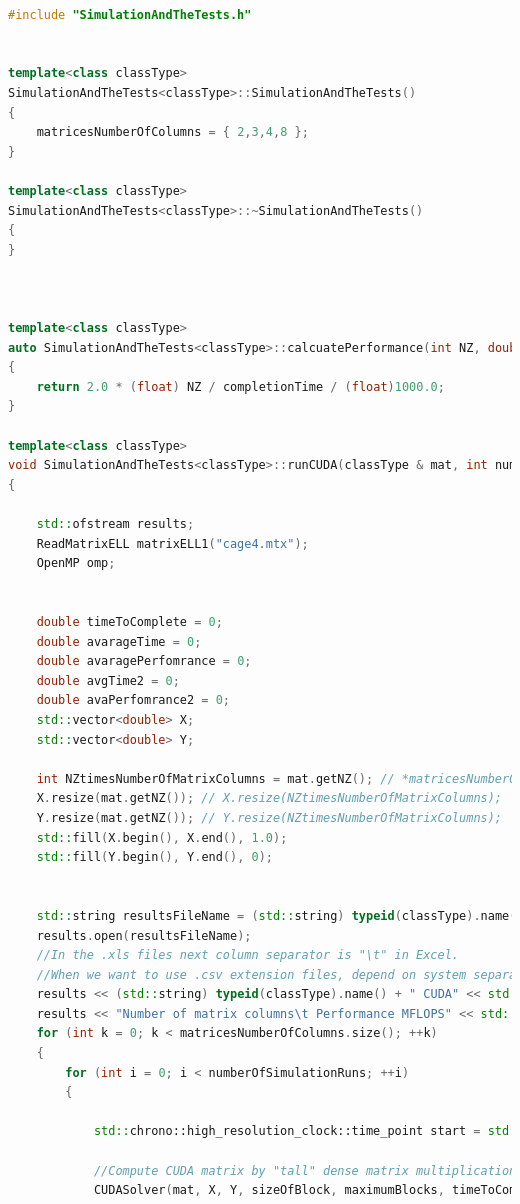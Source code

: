 \documentclass{scrreprt}
\begin{document}
\begin{lstlisting}[language=C++, caption=SimulationAndTheTests.cpp]

#include "SimulationAndTheTests.h"


template<class classType>
SimulationAndTheTests<classType>::SimulationAndTheTests()
{
	matricesNumberOfColumns = { 2,3,4,8 };
}

template<class classType>
SimulationAndTheTests<classType>::~SimulationAndTheTests()
{
}



template<class classType>
auto SimulationAndTheTests<classType>::calcuatePerformance(int NZ, double completionTime)
{
	return 2.0 * (float) NZ / completionTime / (float)1000.0;
}

template<class classType>
void SimulationAndTheTests<classType>::runCUDA(classType & mat, int numberOfThreads, int sizeOfBlock, int maximumBlocks, int numberOfSimulationRuns)
{

	std::ofstream results;
	ReadMatrixELL matrixELL1("cage4.mtx");
	OpenMP omp;


	double timeToComplete = 0;
	double avarageTime = 0;
	double avaragePerfomrance = 0;
	double avgTime2 = 0;
	double avaPerfomrance2 = 0;
	std::vector<double> X;
	std::vector<double> Y;

	int NZtimesNumberOfMatrixColumns = mat.getNZ(); // *matricesNumberOfColumns[k];
	X.resize(mat.getNZ()); // X.resize(NZtimesNumberOfMatrixColumns);
	Y.resize(mat.getNZ()); // Y.resize(NZtimesNumberOfMatrixColumns);
	std::fill(X.begin(), X.end(), 1.0);
	std::fill(Y.begin(), Y.end(), 0);


	std::string resultsFileName = (std::string) typeid(classType).name() + "CUDA" + mat.getMatrixName() + ".xls";
	results.open(resultsFileName);
	//In the .xls files next column separator is "\t" in Excel. 
	//When we want to use .csv extension files, depend on system separator could be "," or ";" .
	results << (std::string) typeid(classType).name() + " CUDA" << std::endl;
	results << "Number of matrix columns\t Performance MFLOPS" << std::endl;
	for (int k = 0; k < matricesNumberOfColumns.size(); ++k)
	{
		for (int i = 0; i < numberOfSimulationRuns; ++i)
		{

			std::chrono::high_resolution_clock::time_point start = std::chrono::high_resolution_clock::now();

			//Compute CUDA matrix by "tall" dense matrix multiplication product
			CUDASolver(mat, X, Y, sizeOfBlock, maximumBlocks, timeToComplete);


\end{lstlisting}
\end{document}
